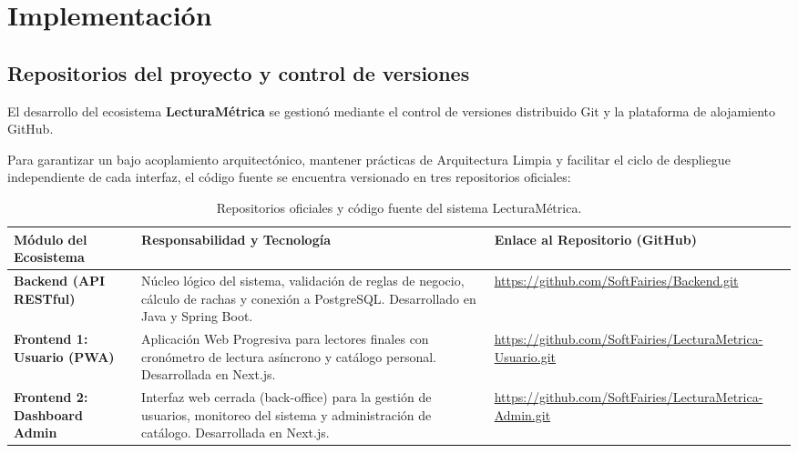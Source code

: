 \documentclass[12pt, atypical, journal]{article}
\begin{document}
\newpage

\section{Implementación}

\subsection{Repositorios del proyecto y control de versiones}
El desarrollo del ecosistema \textbf{LecturaMétrica} se gestionó mediante el control de versiones distribuido Git y la plataforma de alojamiento GitHub. 

Para garantizar un bajo acoplamiento arquitectónico, mantener prácticas de Arquitectura Limpia y facilitar el ciclo de despliegue independiente de cada interfaz, el código fuente se encuentra versionado en tres repositorios oficiales:

\begin{table}[H]
\centering
\footnotesize
\begin{tabular}{|p{3.8cm}|p{6.2cm}|p{4.5cm}|}
\hline
\textbf{Módulo del Ecosistema} & \textbf{Responsabilidad y Tecnología} & \textbf{Enlace al Repositorio (GitHub)} \\ \hline
\textbf{Backend (API RESTful)} & Núcleo lógico del sistema, validación de reglas de negocio, cálculo de rachas y conexión a PostgreSQL. Desarrollado en Java y Spring Boot. & \url{https://github.com/SoftFairies/Backend.git} \\ \hline
\textbf{Frontend 1: Usuario (PWA)} & Aplicación Web Progresiva para lectores finales con cronómetro de lectura asíncrono y catálogo personal. Desarrollada en Next.js. & \url{https://github.com/SoftFairies/LecturaMetrica-Usuario.git} \\ \hline
\textbf{Frontend 2: Dashboard Admin} & Interfaz web cerrada (back-office) para la gestión de usuarios, monitoreo del sistema y administración de catálogo. Desarrollada en Next.js. & \url{https://github.com/SoftFairies/LecturaMetrica-Admin.git} \\ \hline
\end{tabular}
\caption{Repositorios oficiales y código fuente del sistema LecturaMétrica.}
\label{tab:repositorios_github}
\end{table}

\vspace{0.2cm}
\end{document}
